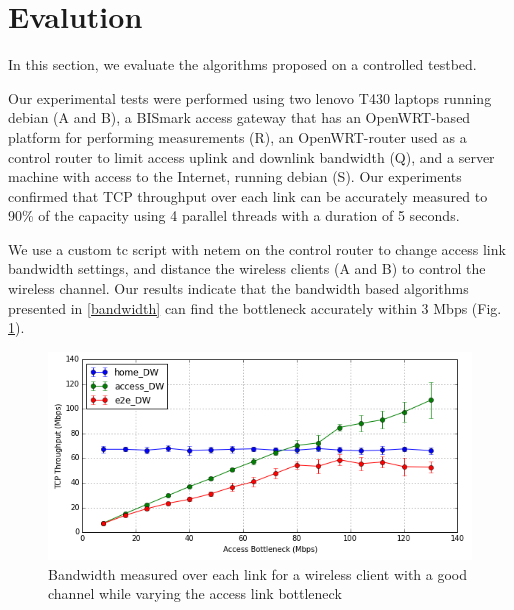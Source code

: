 \section{Evalution}
\label{evaluation} 
In this section, we evaluate the algorithms proposed on a controlled testbed.

Our experimental tests were performed using two lenovo T430 laptops running debian (A and B), a BISmark access gateway \cite{sundaresan2011broadband} that has an OpenWRT-based platform for performing measurements (R), an OpenWRT-router used as a control router to limit access uplink and downlink bandwidth (Q), and a server machine with access to the Internet, running debian (S). Our experiments confirmed that TCP throughput over each link can be accurately measured to 90\% of the capacity using 4 parallel threads with a duration of 5 seconds.

We use a custom tc script with netem \cite{netem} on the control router to change access link bandwidth settings, and distance the wireless clients (A and B) to control the wireless channel. Our results indicate that the bandwidth based algorithms presented in \ref{bandwidth} can find the bottleneck accurately within 3 Mbps (Fig. \ref{fig:throughput_vs_bottleneck}).

\begin{figure}[!ht]
  \centering
  \includegraphics[width=\linewidth]{figures/tcp_throughput_vs_bottleneck.png}
  \caption{Bandwidth measured over each link for a wireless client with a good channel while varying the access link bottleneck}
  \label{fig:throughput_vs_bottleneck}
\end{figure}



